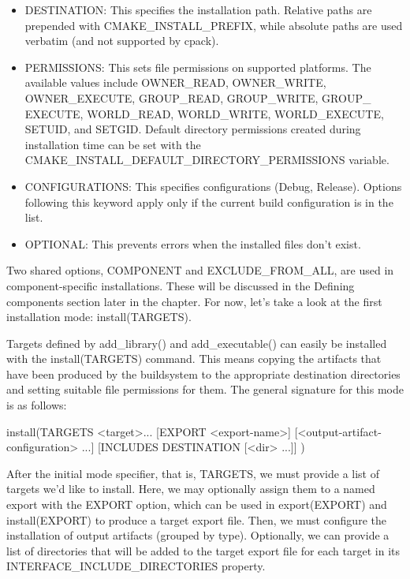 \begin{itemize}
\item
DESTINATION: This specifies the installation path. Relative paths are prepended with CMAKE\_INSTALL\_PREFIX, while absolute paths are used verbatim (and not supported by cpack).

\item
PERMISSIONS: This sets file permissions on supported platforms. The available values include OWNER\_READ, OWNER\_WRITE, OWNER\_EXECUTE, GROUP\_READ, GROUP\_WRITE, GROUP\_ EXECUTE, WORLD\_READ, WORLD\_WRITE, WORLD\_EXECUTE, SETUID, and SETGID. Default directory permissions created during installation time can be set with the CMAKE\_INSTALL\_DEFAULT\_DIRECTORY\_PERMISSIONS variable.

\item
CONFIGURATIONS: This specifies configurations (Debug, Release). Options following this keyword apply only if the current build configuration is in the list.

\item
OPTIONAL: This prevents errors when the installed files don’t exist.
\end{itemize}

Two shared options, COMPONENT and EXCLUDE\_FROM\_ALL, are used in component-specific installations. These will be discussed in the Defining components section later in the chapter. For now, let’s take a look at the first installation mode: install(TARGETS).


Targets defined by add\_library() and add\_executable() can easily be installed with the install(TARGETS) command. This means copying the artifacts that have been produced by the buildsystem to the appropriate destination directories and setting suitable file permissions for them. The general signature for this mode is as follows:

\begin{shell}
install(TARGETS <target>... [EXPORT <export-name>]
        [<output-artifact-configuration> ...]
        [INCLUDES DESTINATION [<dir> ...]]
)
\end{shell}

After the initial mode specifier, that is, TARGETS, we must provide a list of targets we’d like to install. Here, we may optionally assign them to a named export with the EXPORT option, which can be used in export(EXPORT) and install(EXPORT) to produce a target export file. Then, we must configure the installation of output artifacts (grouped by type). Optionally, we can provide a list of directories that will be added to the target export file for each target in its INTERFACE\_INCLUDE\_DIRECTORIES property.

